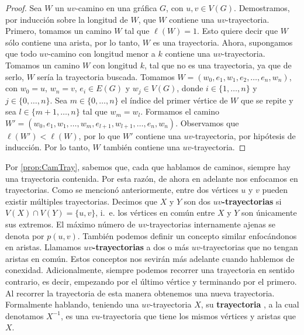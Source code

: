 \begin{proof}
    Sea $W$ un $uv$-camino en una gr\'afica $G$, con $u,v \in V(G)$.
    Demostramos, por inducci\'on sobre la longitud de $W$, que $W$ contiene una
    $uv$-trayectoria. Primero, tomamos un camino $W$ tal que $\ell(W)=1$. Esto
    quiere decir que $W$ s\'olo contiene una arista, por lo tanto, $W$ es una
    trayectoria. Ahora, supongamos que todo $uv$-camino con longitud menor a $k$
    contiene una $uv$-trayectoria. Tomamos un camino $W$ con longitud $k$, tal
    que no es una trayectoria, ya que de serlo, $W$ ser\'ia la trayectoria
    buscada. Tomamos $W= (w_0,e_1,w_1,e_2, \dots, e_n,w_n)$, con $w_0=u$,
    $w_n=v$, $e_i \in E(G)$ y $w_j \in V(G)$, donde $i \in \{1, \dots, n\}$ y $j
    \in \{0, \dots, n\}$. Sea $m \in \{0, \dots, n\}$ el \'indice del primer
    v\'ertice de $W$ que se repite y sea $l \in \{m+1, \dots, n\}$ tal que $w_m
    = w_l$. Formamos el camino $W'= (w_0,e_1,w_1,\dots, w_m, e_{l+1}, w_{l+1},
    \dots, e_n,w_n)$. Observamos que $\ell(W')<\ell(W)$, por lo que $W'$
    contiene una $uv$-trayectoria, por hip\'otesis de inducci\'on. Por lo tanto,
    $W$ tambi\'en contiene una $uv$-trayectoria.
\end{proof}

Por \cref{prop:CamTray}, sabemos que, cada que hablamos de caminos, siempre hay
una trayectoria contenida. Por esta raz\'on, de ahora en adelante nos enfocamos
en trayectorias. Como se mencion\'o anteriormente, entre dos v\'ertices $u$ y
$v$ pueden existir m\'ultiples trayectorias. Decimos que $X$ y $Y$ son dos
\textbf{$uv$-trayectorias} 
si $V(X)\cap V(Y)=\{u,v\}$, i.~e. los v\'ertices en com\'un entre $X$ y $Y$ son
\'unicamente sus extremos. El m\'aximo n\'umero de $uv$-trayectorias
internamente ajenas se denota por $p(u,v)$. Tambi\'en podemos definir un
concepto similar enfoc\'andonos en aristas. Llamamos \textbf{$uv$-trayectorias}
 a dos o m\'as
$uv$-trayectorias que no tengan aristas en com\'un. Estos conceptos nos
sevir\'an m\'as adelante cuando hablemos de conexidad. Adicionalmente, siempre
podemos recorrer una trayectoria en sentido contrario, es decir, empezando por
el \'ultimo v\'ertice y terminando por el primero. Al recorrer la trayectoria de
esta manera obtenemos una nueva trayectoria. Formalmente hablando, teniendo una
$uv$-trayectoria $X$, su \textbf{trayectoria} ,
a la cual denotamos $X^{-1}$, es una $vu$-trayectoria que tiene los mismos
v\'ertices y aristas que $X$.

